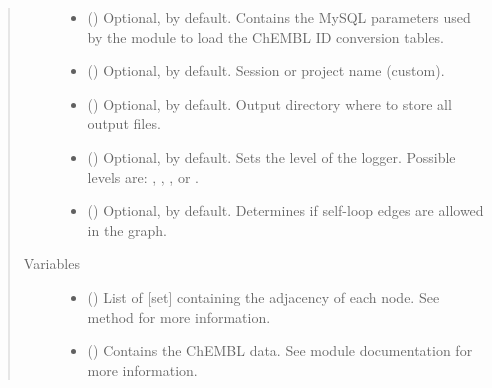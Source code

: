 \documentclass[letterpaper,10pt,english]{sphinxmanual}
\begin{document}
\begin{fulllineitems}
\begin{quote}
\begin{description}
\begin{itemize}
\item {} 
 () \textendash{} Optional,  by default. Contains the MySQL
parameters used by the  module to load
the ChEMBL ID conversion tables.

\item {} 
 () \textendash{} Optional,  by default. Session or project name
(custom).

\item {} 
 () \textendash{} Optional,  by default. Output directory where to
store all output files.

\item {} 
 () \textendash{} Optional,  by default. Sets the level of the logger.
Possible levels are: , , ,
 or .

\item {} 
 () \textendash{} Optional,  by default. Determines if self-loop edges
are allowed in the graph.

\end{itemize}

\item[{Variables}] \leavevmode\begin{itemize}
\item {} 
 () \textendash{} List of {[}set{]} containing the adjacency of each node. See
{\hyperref[\detokenize{main:pypath.main.PyPath.update_adjlist}]{}} method for more information.

\item {} 
 () \textendash{} Contains the ChEMBL data. See  module
documentation for more information.


\end{itemize}
\end{description}
\end{quote}
\end{fulllineitems}
\end{document}

